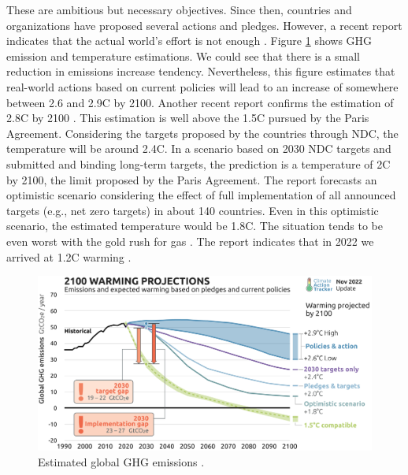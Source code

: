 These are ambitious but necessary objectives. Since then, countries and organizations have proposed several actions and pledges. However, a recent report indicates that the actual world's effort is not enough \cite{tracker2022projections}. Figure \ref{fig:ghg_cat} shows GHG emission and temperature estimations. We could see that there is a small reduction in emissions increase tendency. Nevertheless, this figure estimates that real-world actions based on current policies will lead to an increase of somewhere between 2.6 and 2.9\degree C by 2100. Another recent report confirms the estimation of 2.8\degree C by 2100 \cite{lee2023ar6}. This estimation is well above the 1.5\degree C pursued by the Paris Agreement. Considering the targets proposed by the countries through NDC, the temperature will be around 2.4\degree C. In a scenario based on 2030 NDC targets and submitted and binding long-term targets, the prediction is a temperature of 2\degree C by 2100, the limit proposed by the Paris Agreement. The report forecasts an optimistic scenario considering the effect of full implementation of all announced targets (e.g., net zero targets) in about 140 countries. Even in this optimistic scenario, the estimated temperature would be 1.8\degree C. The situation tends to be even worst with the gold rush for gas \cite{tracker2022massive}. The report indicates that in 2022 we arrived at 1.2\degree C warming \cite{tracker2022projections}.

\begin{figure}[!htb]
    \centering
    \includegraphics[scale=0.09]{Images/Related_works/Emissions_2022-11.png}
    \caption[Estimated global GHG emissions.]{Estimated global GHG emissions \cite{tracker2022projections}.}
    \label{fig:ghg_cat}
\end{figure}

